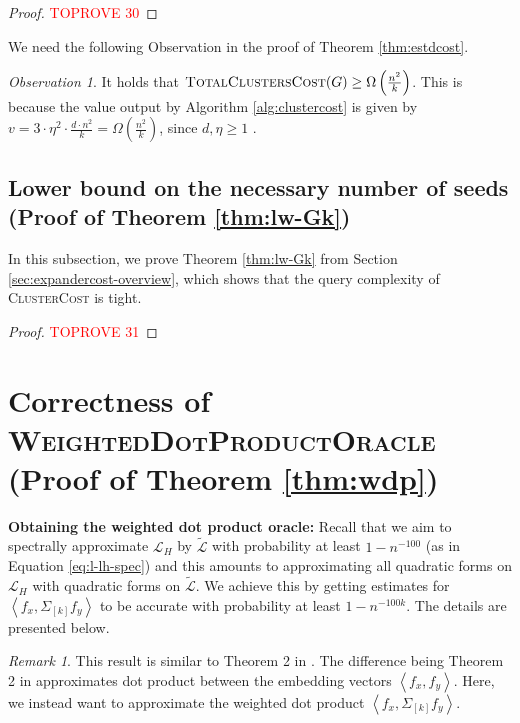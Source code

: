 \documentclass[letterpaper,11pt]{article}
\newcommand{\cL}{\mathcal{L}}
\theoremstyle{plain}
\theoremstyle{definition}
\theoremstyle{remark}
\newtheorem{remark}[theorem]{Remark}
\newtheorem{observation}{Observation}
\newcommand{\rdp}[1]
  {\ensuremath{\left\langle #1 \right\rangle}}
\newcommand{\wt}[1]{\widetilde{#1}}
\begin{document}
\totalclustercost*
\begin{proof}\textcolor{red}{TOPROVE 30}\end{proof}
We need the following Observation in the proof of Theorem \ref{thm:estdcost}.
\begin{observation}
    \label{lem:lw-cost-exp}
	It holds that $\textsc{TotalClustersCost}(G) \geq \Omega\left(\frac{n^2}{k}\right)$. This is because the value output by Algorithm \ref{alg:clustercost} is given by $v = 3 \cdot \eta^2 \cdot \frac{d \cdot n^2}{k} =  \Omega\left(\frac{n^2}{k}\right)$, since $d, \eta  \geq 1$ . 
\end{observation}


\subsection{Lower bound on the necessary number of seeds (Proof of Theorem \ref{thm:lw-Gk})}\label{sec:tightrunningtime}
In this subsection, we prove Theorem \ref{thm:lw-Gk} from Section \ref{sec:expandercost-overview}, which shows that the query complexity of \textsc{ClusterCost} is tight. 

\unionclusterableruntimetight*

\begin{proof}\textcolor{red}{TOPROVE 31}\end{proof}
 \section{Correctness of \textsc{WeightedDotProductOracle} (Proof of Theorem \ref{thm:wdp})}
\label{sec:wdp:oracle}

{\bf Obtaining the weighted dot product oracle:} 
Recall that we aim to spectrally approximate
$\cL_H$ by $\wt{\cL}$ with probability at least $1-n^{-100}$ (as in Equation \eqref{eq:l-lh-spec}) and this amounts to approximating all quadratic
forms on $\cL_H$ with quadratic forms on $\wt{\cL}$. We achieve this by getting  estimates for $\rdp{f_x, \Sigma_{[k]} f_y}$ to be accurate with probability at
least $1 - n^{-100k}$. The details are presented below. 


\thmweighteddot*

\begin{remark} \label{rem:eta:in:runningtime}
	This result is similar to Theorem 2 in \cite{GluchKLMS21}. The difference being Theorem 2 in 
	\cite{GluchKLMS21} approximates dot product between the embedding vectors $\rdp{f_x, f_y}$. 
	Here, we instead want to approximate the weighted dot product $\rdp{f_x, \Sigma_{[k]} f_y}$.
\end{remark}
\end{document}
